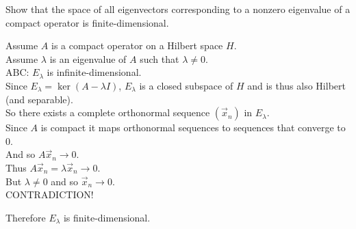 \documentclass[letterpaper,12pt,fleqn]{article}
\newcommand{\vx}{\vec{x}}
\renewcommand{\l}{\lambda}
\begin{document}
Show that the space of all eigenvectors corresponding to a nonzero eigenvalue
of a compact operator is finite-dimensional.

Assume $A$ is a compact operator on a Hilbert space $H$. \\
Assume $\l$ is an eigenvalue of $A$ such that $\l\ne0$. \\
ABC: $E_{\l}$ is infinite-dimensional. \\
Since $E_{\l}=\ker(A-\l I)$, $E_{\l}$ is a closed subspace of $H$ and is thus
also Hilbert (and separable). \\ 
So there exists a complete orthonormal sequence $(\vx_n)$ in $E_{\l}$. \\
Since $A$ is compact it maps orthonormal sequences to sequences that
converge to $0$. \\
And so $A\vx_n\to0$. \\
Thus $A\vx_n=\l\vx_n\to0$. \\
But $\l\ne0$ and so $\vx_n\to0$. \\
CONTRADICTION!

Therefore $E_{\l}$ is finite-dimensional.
\end{document}

